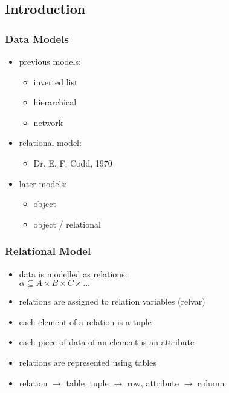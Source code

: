 \documentclass[dvipsnames]{beamer}
\theoremstyle{plain}
\begin{document}
\subsection{Introduction}

\begin{frame}
  \frametitle{Data Models}

  \begin{itemize}
    \item previous models:
    \begin{itemize}
      \item inverted list
      \item hierarchical
      \item network
    \end{itemize}

    \pause
    \item relational model:
    \begin{itemize}
      \item Dr. E. F. Codd, 1970
    \end{itemize}

    \pause
    \item later models:
    \begin{itemize}
      \item object
      \item object / relational
    \end{itemize}
  \end{itemize}
\end{frame}

\begin{frame}
  \frametitle{Relational Model}

  \begin{itemize}
    \item data is modelled as \alert{relations}:\\
      $\alpha \subseteq A \times B \times C \times ...$

    \pause
    \medskip
    \item relations are assigned to \alert{relation variables} (relvar)
    \item each element of a relation is a \alert{tuple}
    \item each piece of data of an element is an \alert{attribute}

    \pause
    \medskip
    \item relations are represented using tables
    \item relation $\rightarrow$ table, tuple $\rightarrow$ row,
      attribute $\rightarrow$ column
  \end{itemize}
\end{frame}
\end{document}
